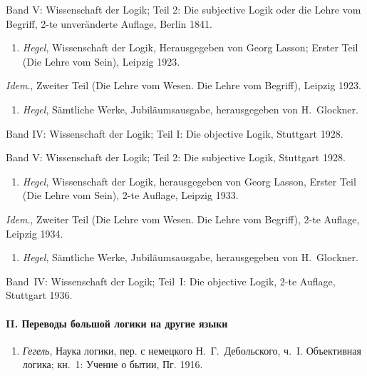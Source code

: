 Band V: Wissenschaft der Logik; Teil 2: Die subjective Logik oder die Lehre
vom Begriff, 2-te unveränderte Auflage, Berlin 1841.


\begin{enumerate}
\item
{\em Hegel}, Wissenschaft der Logik, Herausgegeben von Georg Lasson;
Erster Teil (Die Lehre vom Sein), Leipzig 1923.
\end{enumerate}

{\em Idem}., Zweiter Teil (Die Lehre vom Wesen. Die Lehre vom Begriff),
Leipzig 1923.

\begin{enumerate}
\item
{\em Hegel}, Sämtliche Werke, Jubiläumsausgabe, herausgegeben von
H.~Glockner.
\end{enumerate}

Band IV: Wissenschaft der Logik; Teil I: Die objective Logik,
Stuttgart 1928.

Band V: Wissenschaft der Logik; Teil 2: Die subjective Logik,
Stuttgart 1928.

\begin{enumerate}
\item
{\em Hegel}, Wissenschaft der Logik, herausgegeben von Georg Lasson,
Erster Teil (Die Lehre vom Sein), 2-te Auflage, Leipzig 1933.
\end{enumerate}

{\em Idem}., Zweiter Teil (Die Lehre vom Wesen. Die Lehre vom Begriff),
2-te Auflage, Leipzig 1934.

\begin{enumerate}
\item
{\em Hegel}, Sämtliche Werke, Jubiläumsausgabe, herausgegeben von
H.~Glockner.
\end{enumerate}

Band~IV: Wissenschaft der Logik; Teil~I: Die objective Logik, 2-te Auflage,
Stuttgart 1936.

\paragraph[II. Переводы большой логики на другие языки]
{II. Переводы большой логики на другие языки }

\begin{enumerate}
\item
{\em Гегель}, Наука логики, пер. с немецкого Н.~Г.~Дебольского, ч.~I.
Объективная логика; кн.~1: Учение о бытии, Пг. 1916.
\end{enumerate}

